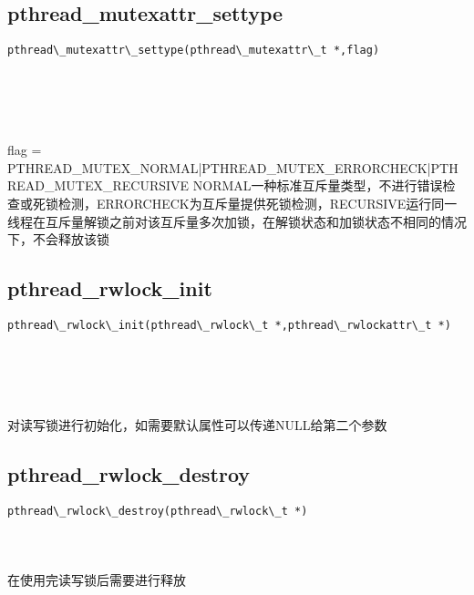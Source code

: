 \documentclass[10pt,a4paper]{article}
\begin{document}
\subsection{pthread\_mutexattr\_settype}
\begin{spacing}{2.0}
\lstset{language=C,numbers=none}
\begin{lstlisting}
pthread\_mutexattr\_settype(pthread\_mutexattr\_t *,flag)
\end{lstlisting}
{\large\color[rgb]{0.2,0.4,0.6}{*:}} \\
{\large\color[rgb]{0.2,0.4,0.6}{flag:}}
\paragraph{ \ \ }flag = PTHREAD\_MUTEX\_NORMAL|PTHREAD\_MUTEX\_ERRORCHECK|PTHREAD\_MUTEX\_RECURSIVE NORMAL一种标准互斥量类型，不进行错误检查或死锁检测，ERRORCHECK为互斥量提供死锁检测，RECURSIVE运行同一线程在互斥量解锁之前对该互斥量多次加锁，在解锁状态和加锁状态不相同的情况下，不会释放该锁
\end{spacing}

\subsection{pthread\_rwlock\_init}
\begin{spacing}{2.0}
\lstset{language=C,numbers=none}
\begin{lstlisting}
pthread\_rwlock\_init(pthread\_rwlock\_t *,pthread\_rwlockattr\_t *)
\end{lstlisting}
{\large\color[rgb]{0.2,0.4,0.6}{*:}} \\
{\large\color[rgb]{0.2,0.4,0.6}{*:}}
\paragraph{ \ \ }对读写锁进行初始化，如需要默认属性可以传递NULL给第二个参数
\end{spacing}

\subsection{pthread\_rwlock\_destroy}
\begin{spacing}{2.0}
\lstset{language=C,numbers=none}
\begin{lstlisting}
pthread\_rwlock\_destroy(pthread\_rwlock\_t *)
\end{lstlisting}
{\large\color[rgb]{0.2,0.4,0.6}{*:}}
\paragraph{ \ \ }在使用完读写锁后需要进行释放
\end{spacing}
\end{document}
